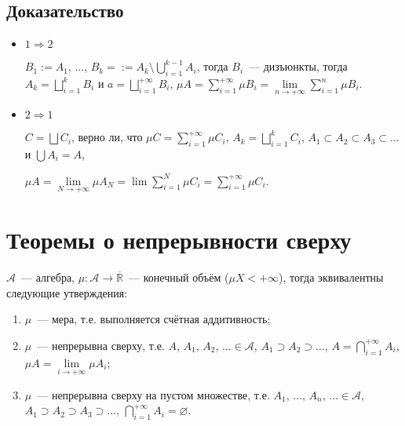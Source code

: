 \documentclass{article}
\begin{document}
        \subsection{Доказательство}
        
            \begin{itemize}
            
                \item $1 \Rightarrow 2$
                    
                    $B_1 := A_1$, $\ldots$, $B_k = := A_k \setminus \bigcup\limits^{k - 1}_{i = 1} A_i$, тогда $B_i$~--- дизъюнкты, тогда $A_k = \bigsqcup\limits^k_{i = 1} B_i$ и $a = \bigsqcup\limits^{+\infty}_{i = 1} B_i$, $\mu A = \sum\limits^{+\infty}_{i = 1} \mu B_i = \lim\limits_{n \rightarrow +\infty} \sum\limits^n_{i = 1} \mu B_i$.
                    
                \item $2 \Rightarrow 1$
                
                    $C = \bigsqcup C_i$, верно ли, что $\mu C = \sum\limits^{+\infty}_{i = 1} \mu C_i$, $A_k = \bigsqcup\limits^k_{i = 1} C_i$, $A_1 \subset A_2 \subset A_3 \subset \ldots$ и $\bigcup A_i = A$,
                    
                    $\mu A = \lim\limits_{N \rightarrow +\infty} \mu A_N = \lim \sum\limits^N_{i = 1} \mu C_i = \sum\limits^{+\infty}_{i = 1} \mu C_i$.
                    
            \end{itemize}
            
    \newpage
    
    \section{Теоремы о непрерывности сверху}
    
        $\mathcal{A}$~--- алгебра, $\mu : \mathcal{A} \rightarrow \overline{\mathbb{R}}$~--- конечный объём ($\mu X < +\infty$), тогда эквивалентны следующие утверждения:
        
        \begin{enumerate}
        
            \item $\mu$~--- мера, т.е. выполняется счётная аддитивность;
            
            \item $\mu$~--- непрерывна сверху, т.е. $A$, $A_1$, $A_2$, $\ldots \in \mathcal{A}$, $A_1 \supset A_2 \supset \ldots$, $A = \bigcap\limits^{+\infty}_{i = 1} A_i$, $\mu A = \lim\limits_{i \rightarrow +\infty} \mu A_i$;
            
            \item $\mu$~--- непрерывна сверху на пустом множестве, т.е. $A_1$, $\ldots$, $A_n$, $\ldots \in \mathcal{A}$, $A_1 \supset A_2 \supset A_3 \supset \ldots$, $\bigcap\limits^{+\infty}_{i = 1} A_i = \varnothing$.
            
        \end{enumerate}
        
\end{document}
